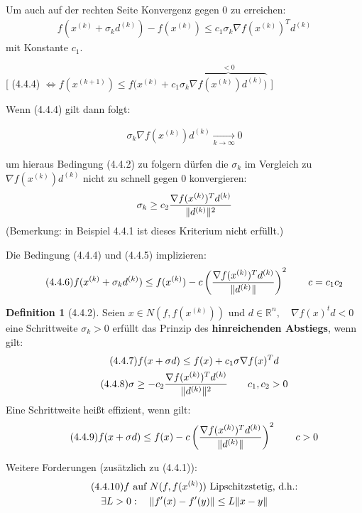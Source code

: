 \documentclass[ngerman,halfparskip]{scrartcl}
\DeclarePairedDelimiter{\norm}{\lVert}{\rVert}
\theoremstyle{definition}
\newtheorem*{defin}{Definition}
\newcommand*{\R}{\mathbb{R}}      %
\begin{document}
Um auch auf der rechten Seite Konvergenz gegen $0$ zu erreichen:
\begin{gather*}\tag{4.4.4}
f(x^{(k)}+\sigma_kd^{(k)})-f(x^{(k)})\leq c_1\sigma_k\nabla f(x^{(k)})^Td^{(k)}
\end{gather*}
mit Konstante $c_1$.

[ (4.4.4) $\Leftrightarrow f(x^{(k+1)})\leq f(x^{(k)}+c_1\sigma_k\overbrace{\nabla f(x^{(k)})d^{(k)})}^{<0}$ ]

Wenn (4.4.4) gilt dann folgt:

\begin{gather*}
\sigma_k\nabla f(x^{(k)})d^{(k)}\xrightarrow[k\rightarrow \infty]{}0
\end{gather*}

um hieraus Bedingung (4.4.2) zu folgern dürfen die $\sigma_k$ im Vergleich zu $\nabla f (x^{(k)})d^{(k)}$ nicht zu schnell gegen $0$ konvergieren:
\begin{gather*}
\sigma_k\geq c_2 \frac{\nabla f(x^{(k)})^Td^{(k)}}{\norm{d^{(k)}}^2}
\end{gather*}
(Bemerkung: in Beispiel 4.4.1 ist dieses Kriterium nicht erfüllt.)

Die Bedingung (4.4.4) und (4.4.5) implizieren:
\begin{gather*}\tag{4.4.6}
f(x^{(k)}+\sigma_kd^{(k)})\leq f(x^{(k)}) - c\left( \frac{\nabla f(x^{(k)})^Td^{(k)}}{\norm{d^{(k)}}} \right)^2 \qquad c=c_1c_2
\end{gather*}

\begin{defin}[4.4.2]
Seien $x\in N(f,f(x^{(k)}))$ und $d\in\R^n, \quad \nabla f (x)^t d<0$ eine Schrittweite $\sigma_k>0$ erfüllt das Prinzip des \textbf{hinreichenden Abstiegs}, wenn gilt:
\begin{gather*}\tag{4.4.7}
f(x+\sigma d)\leq f(x)+c_1\sigma\nabla f(x)^Td\\
\tag{4.4.8} \sigma \geq -c_2 \frac{\nabla f(x^{(k)})^Td^{(k)}}{\norm{d^{(k)}}^2} \qquad c_1,c_2>0
\end{gather*}
Eine Schrittweite heißt effizient, wenn gilt:
\begin{gather*}
\tag{4.4.9} f(x+\sigma d)\leq f(x)-c\left( \frac{\nabla f(x^{(k)})^Td^{(k)}}{\norm{d^{(k)}}} \right)^2 \qquad c>0
\end{gather*}
\end{defin}

Weitere Forderungen (zusätzlich zu (4.4.1)):
\begin{gather*}
\tag{4.4.10} f\text{ auf } N(f,f(x^{(k)})) \text{ Lipschitzstetig, d.h.:}\\
\exists L>0: \quad \norm{f'(x)-f'(y)}\leq L\norm{x-y}
\end{gather*}
\end{document}
